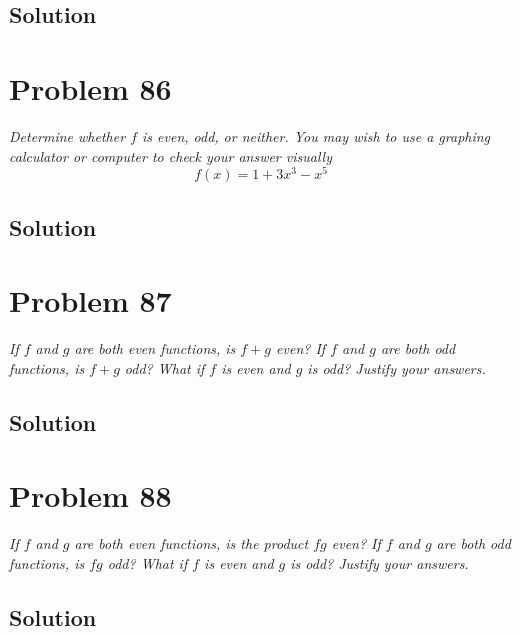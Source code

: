 \documentclass[11pt]{article}
\newcommand{\soln}{\subsection*}
\newcommand{\qn}{\textit}
\begin{document}
\soln{Solution}

\section*{Problem 86}

\qn{Determine whether $f$ is even, odd, or neither. You may wish to use a graphing calculator or computer to check your answer visually $$f(x)=1+3x^3-x^5$$}

\soln{Solution}

\section*{Problem 87}

\qn{If $f$ and $g$ are both even functions, is $f+g$ even? If $f$ and $g$ are both odd functions, is $f+g$ odd? What if $f$ is even and $g$ is odd? Justify your answers.}

\soln{Solution}

\section*{Problem 88}

\qn{If $f$ and $g$ are both even functions, is the product $fg$ even? If $f$ and $g$ are both odd functions, is $fg$ odd? What if $f$ is even and $g$ is odd? Justify your answers.}

\soln{Solution}
\end{document}
